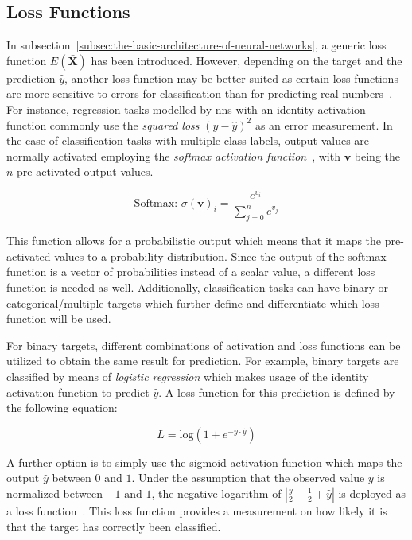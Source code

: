 \documentclass[draft,final]{vutinfth} %
\newcommand{\p}[1]{see p. #1}
\begin{document}
    \subsection{Loss Functions}\label{subsec:loss-functions}
    In subsection~\ref{subsec:the-basic-architecture-of-neural-networks}, a generic loss function $E(\bar{\boldsymbol{X}})$ has been introduced.
    However, depending on the target and the prediction $\hat{y}$, another loss function may be better suited as certain loss functions are more sensitive to errors for classification than for predicting real numbers~\citep[\p{15}]{aggarwal_neural_2018}.
    For instance, regression tasks modelled by \glspl{nn} with an identity activation function commonly use the \textit{squared loss} $(y - \hat{y})^2$ as an error measurement.
    In the case of classification tasks with multiple class labels, output values are normally activated employing the \textit{softmax activation function}~\citep[\p{78}]{goodfellow_deep_2016}, with $\boldsymbol{v}$ being the $n$ pre-activated output values.

    \[
        \text{Softmax: } \sigma(\boldsymbol{v})_i = \frac{e^{v_i}}{\sum_{j=0}^{n}e^{v_j}}
    \]

    This function allows for a probabilistic output which means that it maps the pre-activated values to a probability distribution.
    Since the output of the softmax function is a vector of probabilities instead of a scalar value, a different loss function is needed as well.
    Additionally, classification tasks can have binary or categorical/multiple targets which further define and differentiate which loss function will be used.

    For binary targets, different combinations of activation and loss functions can be utilized to obtain the same result for prediction.
    For example, binary targets are classified by means of \textit{logistic regression} which makes usage of the identity activation function to predict $\hat{y}$.
    A loss function for this prediction is defined by the following equation:

    \begin{equation}
        L=\text{log}(1+e^{-y\cdot\hat{y}})
    \end{equation}

    A further option is to simply use the sigmoid activation function which maps the output $\hat{y}$ between $0 \text{ and } 1$.
    Under the assumption that the observed value $y$ is normalized between $-1 \text{ and } 1$, the negative logarithm of $|\frac{y}{2}-\frac{1}{2}+\hat{y}|$ is deployed as a loss function~\citep[\p{15}]{aggarwal_neural_2018}.
    This loss function provides a measurement on how likely it is that the target has correctly been classified.
\end{document}
